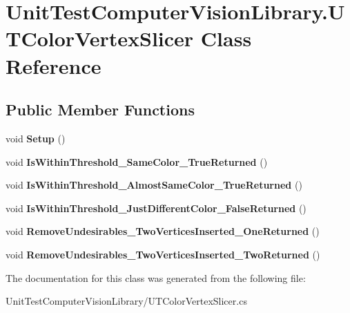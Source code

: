 \hypertarget{class_unit_test_computer_vision_library_1_1_u_t_color_vertex_slicer}{}\section{Unit\+Test\+Computer\+Vision\+Library.\+U\+T\+Color\+Vertex\+Slicer Class Reference}
\label{class_unit_test_computer_vision_library_1_1_u_t_color_vertex_slicer}
\subsection*{Public Member Functions}
\begin{DoxyCompactItemize}
\item 
\hypertarget{class_unit_test_computer_vision_library_1_1_u_t_color_vertex_slicer_a6e27b92bb87f659a74238557638007dc}{}\label{class_unit_test_computer_vision_library_1_1_u_t_color_vertex_slicer_a6e27b92bb87f659a74238557638007dc} 
void {\bfseries Setup} ()
\item 
\hypertarget{class_unit_test_computer_vision_library_1_1_u_t_color_vertex_slicer_a772e7fe865026febc49d15c902a0c822}{}\label{class_unit_test_computer_vision_library_1_1_u_t_color_vertex_slicer_a772e7fe865026febc49d15c902a0c822} 
void {\bfseries Is\+Within\+Threshold\+\_\+\+Same\+Color\+\_\+\+True\+Returned} ()
\item 
\hypertarget{class_unit_test_computer_vision_library_1_1_u_t_color_vertex_slicer_a8da53ad14205097eb874a8fa6003dd8d}{}\label{class_unit_test_computer_vision_library_1_1_u_t_color_vertex_slicer_a8da53ad14205097eb874a8fa6003dd8d} 
void {\bfseries Is\+Within\+Threshold\+\_\+\+Almost\+Same\+Color\+\_\+\+True\+Returned} ()
\item 
\hypertarget{class_unit_test_computer_vision_library_1_1_u_t_color_vertex_slicer_a8bb8a56f0870cb5b12136d662d5f4305}{}\label{class_unit_test_computer_vision_library_1_1_u_t_color_vertex_slicer_a8bb8a56f0870cb5b12136d662d5f4305} 
void {\bfseries Is\+Within\+Threshold\+\_\+\+Just\+Different\+Color\+\_\+\+False\+Returned} ()
\item 
\hypertarget{class_unit_test_computer_vision_library_1_1_u_t_color_vertex_slicer_a16bec2d221f894aa72c46fb260ba108a}{}\label{class_unit_test_computer_vision_library_1_1_u_t_color_vertex_slicer_a16bec2d221f894aa72c46fb260ba108a} 
void {\bfseries Remove\+Undesirables\+\_\+\+Two\+Vertices\+Inserted\+\_\+\+One\+Returned} ()
\item 
\hypertarget{class_unit_test_computer_vision_library_1_1_u_t_color_vertex_slicer_a413511e8674ab1b1e6de98b2033910f7}{}\label{class_unit_test_computer_vision_library_1_1_u_t_color_vertex_slicer_a413511e8674ab1b1e6de98b2033910f7} 
void {\bfseries Remove\+Undesirables\+\_\+\+Two\+Vertices\+Inserted\+\_\+\+Two\+Returned} ()
\end{DoxyCompactItemize}


The documentation for this class was generated from the following file\+:\begin{DoxyCompactItemize}
\item 
Unit\+Test\+Computer\+Vision\+Library/U\+T\+Color\+Vertex\+Slicer.\+cs\end{DoxyCompactItemize}
